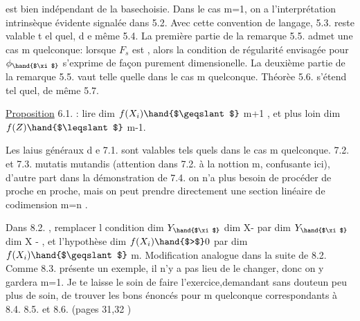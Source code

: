 
est bien indépendant de la base\hand{/}choisie.  Dans le cas  m=1, on a
l'interprétation intrinsèque évidente signalée dans 5.2.  Avec cette
convention de langage, 5.3.  reste valable t el quel, d e même 5.4.
La première partie de la remarque 5.5.   admet une  
 cas m quelconque:  lorsque $F_s$  est  , alors la condition de
régularité envisagée pour $\phi_{\hand{$\xi$}}$  s'exprime de façon purement dimensionelle.
La deuxième partie de la remarque 5.5. vaut telle quelle dans le cas
m quelconque.      Théorèe 5.6.  s'étend tel quel,  de même 5.7.

\uline{Proposition} 6.1.  :  lire   dim $f(X_i) \hand{$\geqslant$}$  m+1 ,  et
plus loin   dim $f(Z) \hand{$\leqslant$}$ m-1.

Les laius généraux d e 7.1. sont valables tels quels dans le cas
m quelconque.  7.2. et 7.3.  mutatis mutandis (attention dans 7.2.
à la nottion m, confusante ici),  d'autre part dans la démonstration
de 7.4. on n'a plus besoin de procéder de proche en proche, mais on
peut prendre directement une section linéaire  de codimension m=n .

Dans 8.2. , remplacer l condition    dim $Y_{\hand{$\xi$}}$ \hand{$>$} dim X-
par  dim $Y_{\hand{$\xi$}}$ \hand{$>$}  dim X  -  , et l'hypothèse  dim $f(X_i) \hand{$>$} 0$  par
dim $f(X_i) \hand{$\geqslant$}$ m.   Modification analogue dans la suite de 8.2.  Comme
8.3.  présente un exemple, il n'y a pas lieu de le changer, donc on
y gardera m=1.   Je te laisse le soin de faire l'exercice,demandant
sans doute\hand{/}un peu plus de soin, de trouver  les bons énoncés pour m
quelconque correspondants à  8.4.  8.5.  et 8.6.   (pages 31,32 )\hand{;}

